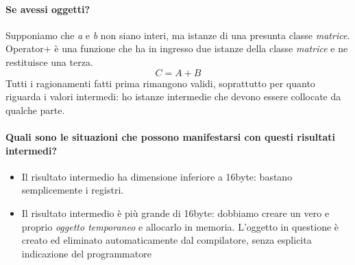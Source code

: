 \documentclass[11pt]{report}
\theoremstyle{definition}
\begin{document}
\paragraph{Se avessi oggetti?} Supponiamo che \emph{a} e \emph{b} non siano interi, ma istanze di una presunta classe \emph{matrice}. Operator+ è una funzione che ha in ingresso due istanze della classe \emph{matrice} e ne restituisce una terza. 
\[C=A+B\]
Tutti i ragionamenti fatti prima rimangono validi, soprattutto per quanto riguarda i valori intermedi: ho istanze intermedie che devono essere collocate da qualche parte. 
\paragraph{Quali sono le situazioni che possono manifestarsi con questi risultati intermedi?}
\begin{itemize}
\item Il risultato intermedio ha dimensione inferiore a 16byte: bastano semplicemente i registri.
\item Il risultato intermedio è più grande di 16byte: dobbiamo creare un vero e proprio \emph{oggetto temporaneo} e allocarlo in memoria. L'oggetto in questione è creato ed eliminato automaticamente dal compilatore, senza esplicita indicazione del programmatore
\end{itemize}
\end{document}
